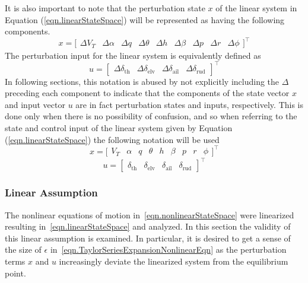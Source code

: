 It is also important to note that the perturbation state $x$ of the linear system in Equation (\ref{eqn.linearStateSpace}) will be represented as having the following components.
\begin{equation*}
  x=\bigr[
  \begin{array}{ccccccccc}
    \Delta V_{T} & \Delta\alpha & \Delta q & \Delta\theta & \Delta h & \Delta\beta & \Delta p & \Delta r & \Delta\phi
  \end{array}\bigr]^{\top}
\end{equation*}
The perturbation input for the linear system is equivalently defined as
\begin{equation*}
  u=\left[
  \begin{array}{cccc}
    \Delta\delta_{\text{th}} & \Delta\delta_{\text{elv}} & \Delta\delta_{\text{ail}} & \Delta\delta_{\text{rud}}
  \end{array}\right]^{\top}
\end{equation*}
In following sections, this notation is abused by not explicitly including the $\Delta$ preceding each component to indicate that the components of the state vector $x$ and input vector $u$ are in fact perturbation states and inputs, respectively.
This is done only when there is no possibility of confusion, and so when referring to the state and control input of the linear system given by Equation (\ref{eqn.linearStateSpace}) the following notation will be used
\begin{equation}
  \label{eqn.perturbedstatevectorx}
  x=\bigr[
  \begin{array}{ccccccccc}
    V_{T} &  \alpha & q &\theta & h & \beta &p & r & \phi
  \end{array}\bigr]^{\top}
\end{equation}
\begin{equation}
  u=\left[
  \begin{array}{cccc}
    \delta_{\text{th}} & \delta_{\text{elv}} & \delta_{\text{ail}} & \delta_{\text{rud}}
  \end{array}\right]^{\top}
\end{equation}

\subsubsection{Linear Assumption}

The nonlinear equations of motion in\ \eqref{eqn.nonlinearStateSpace} were linearized resulting in\ \eqref{eqn.linearStateSpace} and analyzed.
In this section the validity of this linear assumption is examined.
In particular, it is desired to get a sense of the size of $\epsilon$ in\ \eqref{eqn.TaylorSeriesExpansionNonlinearEqn} as the perturbation terms $x$ and $u$ increasingly deviate the linearized system from the equilibrium point.


